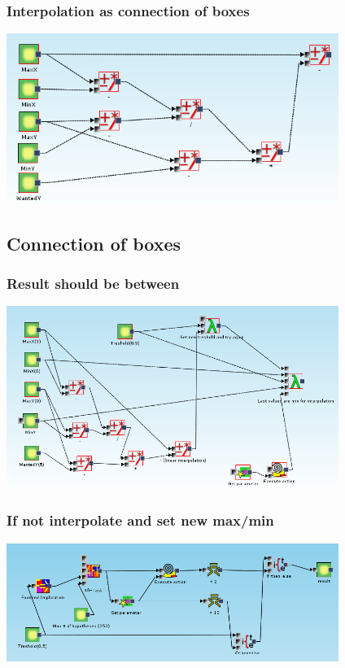 \documentclass{beamer}
\begin{document}
\begin{frame}
	\frametitle{Interpolation as connection of boxes}
	\includegraphics[width=10.8cm]{linearInterpolation}
\end{frame}

\subsection{Connection of boxes}
\begin{frame}
	\frametitle{Result should be between}
	\includegraphics[width=10.8cm]{exampleMainRecursionPart}
\end{frame}

\begin{frame}
	\frametitle{If not interpolate and set new max/min}
	\includegraphics[width=10.8cm]{exampleMainMiningPart}
\end{frame}
\end{document}
